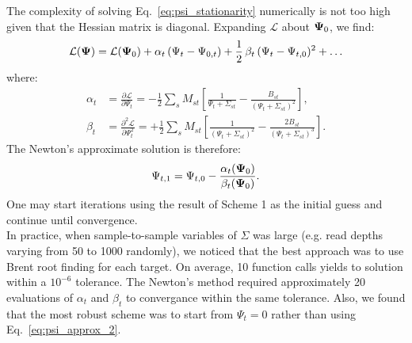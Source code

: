\documentclass[nofootinbib,amssymb,amsmath]{revtex4}
\newcommand{\vPsi}{{\bf \Psi}}
\begin{document}
 The complexity of solving Eq.~\eqref{eq:psi_stationarity} numerically is not too high given that the Hessian matrix is diagonal. Expanding $\mathcal{L}$ about $\vPsi_0$, we find:
\begin{equation}
\mathcal{L}(\vPsi) = \mathcal{L}(\vPsi_0) + \alpha_t \, (\Psi_t - \Psi_{0,t}) + \frac{1}{2} \, \beta_t \, (\Psi_t - \Psi_{t,0})^2 + \ldots
\end{equation}
where:
\begin{align}
\alpha_t &= \frac{\partial \mathcal{L}}{\partial \Psi_t} = -\frac{1}{2}\sum_s M_{st}\left[\frac{1}{\Psi_t + \Sigma_{st}} - \frac{B_{st}}{(\Psi_t + \Sigma_{st})^2}\right],\nonumber\\
\beta_t &= \frac{\partial^2 \mathcal{L}}{\partial \Psi_t^2} = +\frac{1}{2}\sum_s M_{st}\left[\frac{1}{(\Psi_t + \Sigma_{st})^2} - \frac{2B_{st}}{(\Psi_t + \Sigma_{st})^3}\right].
\end{align}
The Newton's approximate solution is therefore:
\begin{equation}
\Psi_{t,1} = \Psi_{t,0} - \frac{\alpha_t(\vPsi_0)}{\beta_t(\vPsi_0)}.
\end{equation}
One may start iterations using the result of Scheme 1 as the initial guess and continue until convergence.\\

 In practice, when sample-to-sample variables of $\Sigma$ was large (e.g. read depths varying from 50 to 1000 randomly), we noticed that the best approach was to use Brent root finding for each target. On average, 10 function calls yields to solution within a $10^{-6}$ tolerance. The Newton's method required approximately 20 evaluations of $\alpha_t$ and $\beta_t$ to convergance within the same tolerance. Also, we found that the most robust scheme was to start from $\Psi_t = 0$ rather than using Eq.~\eqref{eq:psi_approx_2}.\\
\end{document}
